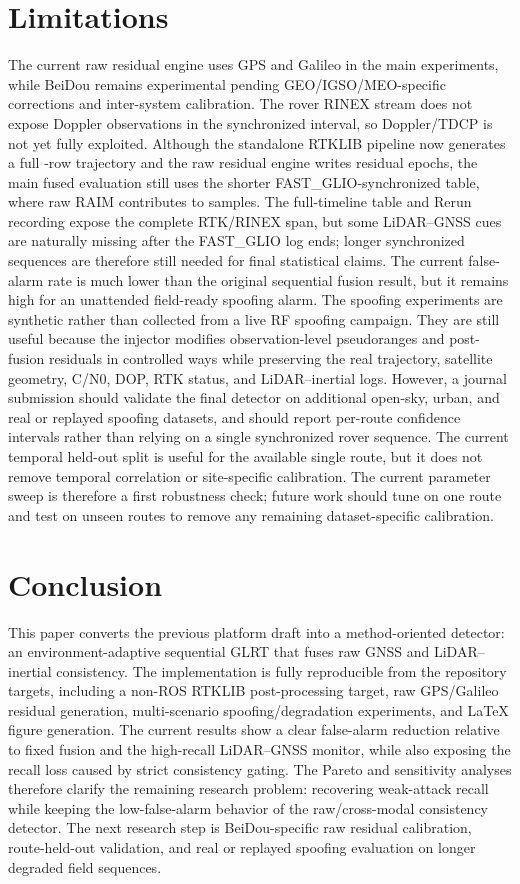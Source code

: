 \documentclass[journal]{IEEEtran}
\begin{document}
\section{Limitations}
The current raw residual engine uses GPS and Galileo in the main experiments, while BeiDou remains experimental pending GEO/IGSO/MEO-specific corrections and inter-system calibration.
The rover RINEX stream does not expose Doppler observations in the synchronized interval, so Doppler/TDCP is not yet fully exploited.
Although the standalone RTKLIB pipeline now generates a full \RtklibSolutionRows{}-row trajectory and the raw residual engine writes \RawResidualWrittenEpochs{} residual epochs, the main fused evaluation still uses the shorter FAST\_GLIO-synchronized table, where raw RAIM contributes to \RawRaimCoverageRows{} samples.
The full-timeline table and Rerun recording expose the complete RTK/RINEX span, but some LiDAR--GNSS cues are naturally missing after the FAST\_GLIO log ends; longer synchronized sequences are therefore still needed for final statistical claims.
The current false-alarm rate is much lower than the original sequential fusion result, but it remains high for an unattended field-ready spoofing alarm.
The spoofing experiments are synthetic rather than collected from a live RF spoofing campaign.
They are still useful because the injector modifies observation-level pseudoranges and post-fusion residuals in controlled ways while preserving the real trajectory, satellite geometry, C/N0, DOP, RTK status, and LiDAR--inertial logs.
However, a journal submission should validate the final detector on additional open-sky, urban, and real or replayed spoofing datasets, and should report per-route confidence intervals rather than relying on a single synchronized rover sequence.
The current temporal held-out split is useful for the available single route, but it does not remove temporal correlation or site-specific calibration.
The current parameter sweep is therefore a first robustness check; future work should tune on one route and test on unseen routes to remove any remaining dataset-specific calibration.

\section{Conclusion}
This paper converts the previous platform draft into a method-oriented detector: an environment-adaptive sequential GLRT that fuses raw GNSS and LiDAR--inertial consistency.
The implementation is fully reproducible from the repository targets, including a non-ROS RTKLIB post-processing target, raw GPS/Galileo residual generation, multi-scenario spoofing/degradation experiments, and LaTeX figure generation.
The current results show a clear false-alarm reduction relative to fixed fusion and the high-recall LiDAR--GNSS monitor, while also exposing the recall loss caused by strict consistency gating.
The Pareto and sensitivity analyses therefore clarify the remaining research problem: recovering weak-attack recall while keeping the low-false-alarm behavior of the raw/cross-modal consistency detector.
The next research step is BeiDou-specific raw residual calibration, route-held-out validation, and real or replayed spoofing evaluation on longer degraded field sequences.
\end{document}
